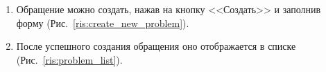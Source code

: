 \documentclass{../includes/TechDoc}
\begin{document}
\begin{enumerate}
        \item Обращение можно создать, нажав на кнопку <<Создать>> и заполнив форму (Рис.~\ref{ris:create_new_problem}).
        \item После успешного создания обращения оно отображается в списке (Рис.~\ref{ris:problem_list}).
        \begin{figure}[ht]
            \begin{center}
                \begin{minipage}[ht]{0.35\linewidth}

\end{minipage}
\end{center}
\end{figure}
\end{enumerate}
\end{document}
